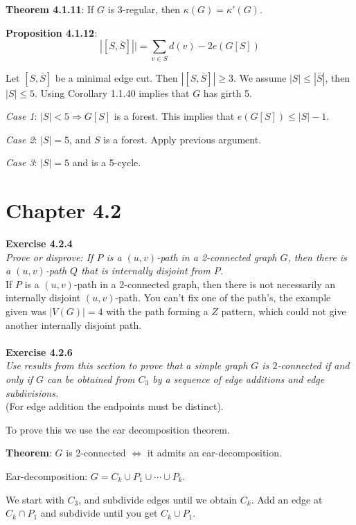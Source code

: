 \textbf{Theorem 4.1.11}: If $G$ is 3-regular, then \(\kappa(G) = \kappa'(G)\).

\textbf{Proposition 4.1.12}:
\[
	|[S, \bar{S}]|| = \sum_{v \in S} d(v) - 2e(G[S])
\]

Let $[S, \bar{S}]$ be a minimal edge cut. Then $|[S, \bar{S}]| \ge 3$. We assume $|S| \le |\bar{S}|$, then $|S| \le 5$. Using Corollary 1.1.40 implies that $G$ has girth 5.

\textit{Case 1}: $|S| < 5 \Rightarrow G[S]$ is a forest. This implies that $e(G[S]) \le |S|-1$.

\textit{Case 2}: $|S| = 5$, and $S$ is a forest. Apply previous argument.

\textit{Case 3}: $|S| = 5$ and is a 5-cycle.

\section{Chapter 4.2}%
\label{sec:label}

\noindent
\textbf{Exercise 4.2.4 }\\
\noindent
\textit{Prove or disprove: If $P$ is a $(u,v)$-path in a 2-connected graph $G$, then there is a $(u,v)$-path $Q$ that is internally disjoint from $P$.}\\
If $P$ is a $(u,v)$-path in a 2-connected graph, then there is not necessarily an internally disjoint $(u,v)$-path. You can't fix one of the path's, the example given was $|V(G)| = 4$ with the path forming a $Z$ pattern, which could not give another internally disjoint path.
\\\\
\noindent
\textbf{Exercise 4.2.6 }\\
\noindent
\textit{Use results from this section to prove that a simple graph $G$ is $2$-connected if and only if $G$ can be obtained from $C_{3}$ by a sequence of edge additions and edge subdivisions.}\\
(For edge addition the endpoints must be distinct).

To prove this we use the ear decomposition theorem.

\textbf{Theorem}: $G$ is 2-connected $\iff$ it admits an ear-decomposition.

Ear-decomposition: $G = C_{k} \cup P_{1} \cup \cdots \cup P_{k}$.

We start with $C_{3}$, and subdivide edges until we obtain $C_{k}$. Add an edge at $C_{k} \cap P_{1}$ and subdivide until you get $C_{k} \cup P_{1}$.

